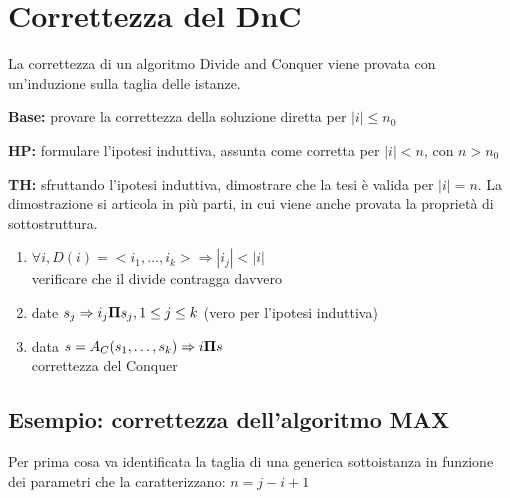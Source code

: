 \section{Correttezza del DnC}

La correttezza di un algoritmo Divide and Conquer viene provata con un'induzione sulla taglia delle istanze.

\begin{description}
    \item{\textbf{Base:}} provare la correttezza della soluzione diretta per $|i| \leq n_0$
    \item{\textbf{HP:}} formulare l'ipotesi induttiva, assunta come corretta per  $|i| < n$, con $n > n_0$
    \item{\textbf{TH:}} sfruttando l'ipotesi induttiva, dimostrare che la tesi è valida per $|i| = n$.
        La dimostrazione si articola in più parti, in cui viene anche provata la proprietà di sottostruttura.
        \begin{enumerate}[noitemsep,topsep=0pt,parsep=0pt,partopsep=0pt]
            \item $\forall i, D(i) = <i_1, \dots, i_k> \Rightarrow |i_j| < |i|$ \\
                verificare che il divide contragga davvero
            \item date $s_j \Rightarrow i_j \bm{\Pi}{} s_j, 1 \leq j \leq k$ (vero per l'ipotesi induttiva)
            \item data $s = A_C (s_1, \dots, s_k) \Rightarrow i \bm{\Pi}{} s$ \\
                correttezza del Conquer
        \end{enumerate}
\end{description}

\subsection{Esempio: correttezza dell'algoritmo MAX}

Per prima cosa va identificata la taglia di una generica sottoistanza in funzione dei parametri che la caratterizzano: $n=j-i+1$


